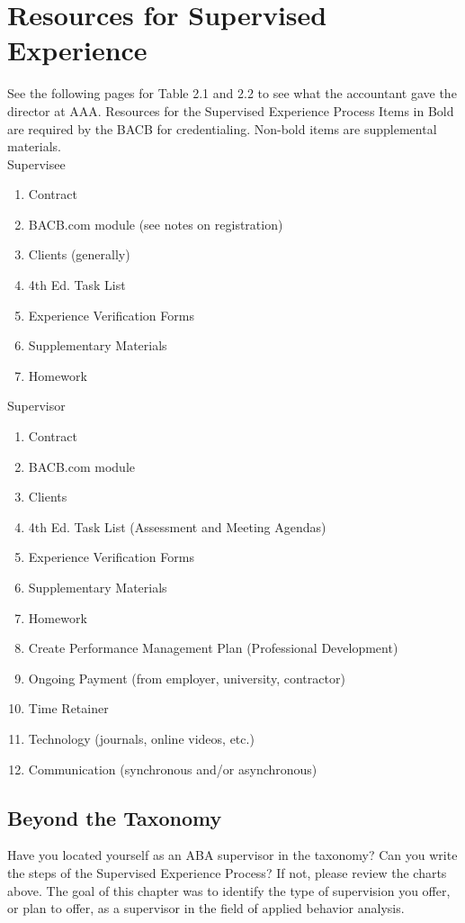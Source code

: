 \section{Resources for Supervised Experience}
See the following pages for Table 2.1 and 2.2 to see what the accountant gave the director at AAA.
Resources for the Supervised Experience Process 
Items in Bold are required by the BACB\textregistered{} for credentialing. Non-bold items are supplemental materials. \\

Supervisee\\
\begin{enumerate}
\item Contract
\item BACB.com module (see notes on registration)
\item Clients (generally)
\item 4th Ed. Task List
\item Experience Verification Forms
\item Supplementary Materials
\item Homework
\end{enumerate}

Supervisor\\
\begin{enumerate}
\item Contract
\item BACB.com module
\item Clients
\item 4th Ed. Task List (Assessment and Meeting Agendas)
\item Experience Verification Forms
\item Supplementary Materials
\item Homework
\item Create Performance Management Plan (Professional Development)
\item Ongoing Payment (from employer, university, contractor)
\item Time Retainer
\item Technology (journals, online videos, etc.)
\item Communication (synchronous and/or asynchronous)
\end{enumerate}

\subsection{Beyond the Taxonomy}
Have you located yourself as an ABA supervisor in the taxonomy? Can you write the steps of the Supervised Experience Process? If not, please review the charts above. The goal of this chapter was to identify the type of supervision you offer, or plan to offer, as a supervisor in the field of applied behavior analysis.

